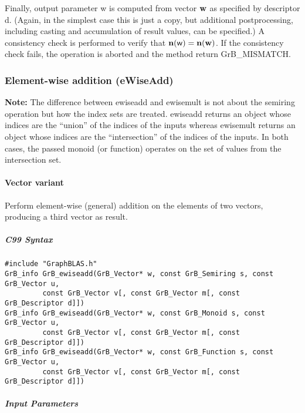 Finally, output parameter {\sf w} is computed from vector ${\bf w}$
as specified by descriptor {\sf d}. (Again, in the simplest case this
is just a copy, but additional postprocessing, including casting and
accumulation of result values, can be specified.)  A consistency check is
performed to verify that $\bold{n}({\sf w}) = \bold{n}({\bf w})$. If
the consistency check fails, the operation is aborted and the method
return {\sf GrB\_MISMATCH}.

\subsubsection{Element-wise addition ({\sf eWiseAdd})}

{\bf Note:} The difference between {\sf ewiseadd} and {\sf ewisemult} is not about the semiring operation but how the index sets are treated.
 {\sf ewiseadd} returns an object whose indices are the ``union'' of the indices of the inputs whereas  
 {\sf ewisemult} returns an object whose indices are the ``intersection'' of the indices of the inputs. In both cases, the passed monoid (or function) operates on the 
 set of values from the intersection set. 

\paragraph{Vector variant}

Perform element-wise (general) addition on the elements of two vectors,
producing a third vector as result.

\subparagraph{C99 Syntax}

\begin{verbatim}
#include "GraphBLAS.h"
GrB_info GrB_ewiseadd(GrB_Vector* w, const GrB_Semiring s, const GrB_Vector u,
         const GrB_Vector v[, const GrB_Vector m[, const GrB_Descriptor d]])
GrB_info GrB_ewiseadd(GrB_Vector* w, const GrB_Monoid s, const GrB_Vector u,
         const GrB_Vector v[, const GrB_Vector m[, const GrB_Descriptor d]])
GrB_info GrB_ewiseadd(GrB_Vector* w, const GrB_Function s, const GrB_Vector u,
         const GrB_Vector v[, const GrB_Vector m[, const GrB_Descriptor d]])
\end{verbatim}

\subparagraph{Input Parameters}

